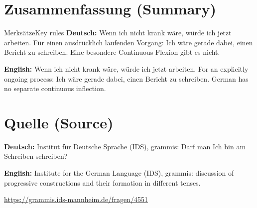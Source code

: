 \documentclass[a4paper,11pt]{article}
\newcommand{\GermanText}[1]{\textbf{Deutsch: }#1\par}
\newcommand{\EnglishText}[1]{{\small\color{SoftGray}\textbf{English: }#1\par}}
\begin{document}
\section{Zusammenfassung \textnormal{(Summary)}}
\begin{grammarentry}{Merksätze}{Key rules}
\GermanText{Wenn ich nicht krank wäre, würde ich jetzt arbeiten. Für einen ausdrücklich laufenden Vorgang: Ich wäre gerade dabei, einen Bericht zu schreiben. Eine besondere Continuous-Flexion gibt es nicht.}
\EnglishText{Wenn ich nicht krank wäre, würde ich jetzt arbeiten. For an explicitly ongoing process: Ich wäre gerade dabei, einen Bericht zu schreiben. German has no separate continuous inflection.}
\end{grammarentry}

\section{Quelle \textnormal{(Source)}}
        \GermanText{Institut für Deutsche Sprache (IDS), grammis: Darf man Ich bin am Schreiben schreiben?}
        \EnglishText{Institute for the German Language (IDS), grammis: discussion of progressive constructions and their formation in different tenses.}
        \url{https://grammis.ids-mannheim.de/fragen/4551}
\end{document}
